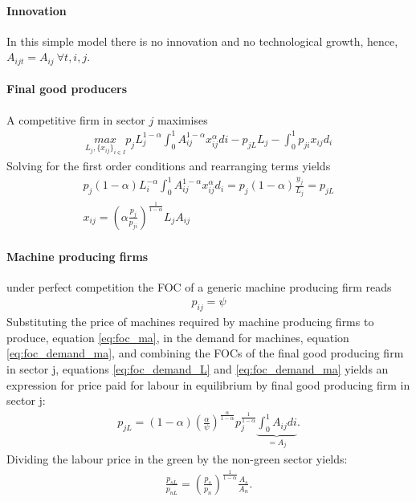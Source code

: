 \paragraph{Innovation}
In this simple model there is no innovation and no technological growth, hence, $A_{ijt}=A_{ij}\ \forall t, i, j$.


\paragraph{Final good producers}
A competitive firm in sector $j$ maximises
\begin{align*}
\underset{L_j, \{x_{ij}\}_{i \in I}}{max} p_{j} L_j^{1-\alpha} \int_{0}^{1}A_{ij}^{1-\alpha}x_{ij}^\alpha di - p_{jL} L_j - \int_{0}^{1} p_{ji}x_{ij} d_i
\end{align*}
Solving for the first order conditions and rearranging terms yields
\begin{align}
p_j(1-\alpha) L_i^{-\alpha}\int_{0}^{1}A_{ij}^{1-\alpha}x_{ij}^\alpha d_i= p_j (1-\alpha)\frac{y_j}{L_j}=p_{jL}\label{eq:foc_demand_L}
\\
x_{ij} = \left(\alpha\frac{p_j}{p_{ji}}\right)^\frac{1}{1-\alpha}L_j A_{ij}\label{eq:foc_demand_ma}
\end{align}

\paragraph{Machine producing firms}
under perfect competition the FOC of a generic machine producing firm reads
\begin{align}\label{eq:foc_ma}
p_{ij}=\psi
\end{align}
Substituting the price of machines required by machine producing firms to produce,  equation \ref{eq:foc_ma}, in the demand for machines, equation \ref{eq:foc_demand_ma}, and combining the FOCs of the final good producing firm in sector j, equations \ref{eq:foc_demand_L} and \ref{eq:foc_demand_ma} yields an expression for price paid for labour in equilibrium by final good producing firm in sector j:
\begin{align}
p_{jL}= (1-\alpha)\left(\frac{\alpha}{\psi}\right)^\frac{\alpha}{1-\alpha}p_j^\frac{1}{1-\alpha}\underbrace{\int_{0}^{1} A_{ij} di}_{=A_j}.
\end{align}
Dividing the labour price in the green by the non-green sector yields:
\begin{align}
\frac{p_{sL}}{p_{nL}}= \left(\frac{p_s}{p_n}\right)^\frac{1}{1-\alpha} \frac{A_s}{A_n}.\label{eq:firms_labrel}
\end{align}

